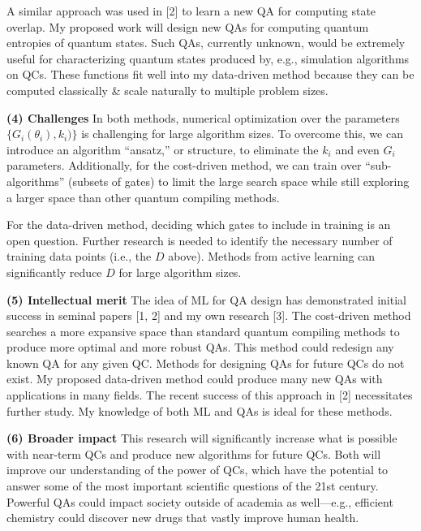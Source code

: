 \documentclass[10pt]{article}
\begin{document}
A similar approach was used in [2] to learn a new QA for computing state overlap. My proposed work will design new QAs for computing quantum entropies of quantum states. Such QAs, currently unknown, would be extremely useful for characterizing quantum states produced by, e.g., simulation algorithms on QCs. These functions fit well into my data-driven method because they can be computed classically \& scale naturally to multiple problem sizes. %




\textbf{(4) Challenges} \tab In both methods, numerical optimization over the parameters $\{G_i(\theta_i), k_i)\}$ is challenging for large algorithm sizes. To overcome this, we can introduce an algorithm ``ansatz,'' or structure, to eliminate the $k_i$ and even $G_i$ parameters. Additionally, for the cost-driven method, we can train over ``sub-algorithms'' (subsets of gates) to limit the large search space while still exploring a larger space than other quantum compiling methods. %

For the data-driven method, deciding which gates to include in training is an open question. Further research is needed to identify the necessary number of training data points (i.e., the $D$ above). Methods from active learning can significantly reduce $D$ for large algorithm sizes.

\textbf{(5) Intellectual merit} The idea of ML for QA design has demonstrated initial success in seminal papers [1, 2] and my own research [3]. The cost-driven method searches a more expansive space than standard quantum compiling methods to produce more optimal and more robust QAs. This method could redesign any known QA for any given QC.
Methods for designing QAs for future QCs do not exist. My proposed data-driven method could produce many new QAs with applications in many fields. The recent success of this approach in [2] necessitates further study. My knowledge of both ML and QAs is ideal for these methods.

\textbf{(6) Broader impact} \tab This research will significantly increase what is possible with near-term QCs and produce new algorithms for future QCs. Both will improve our understanding of the power of QCs, which have the potential to answer some of the most important scientific questions of the 21st century. Powerful QAs could impact society outside of academia as well---e.g., efficient chemistry could discover new drugs that vastly improve human health.
\end{document}

